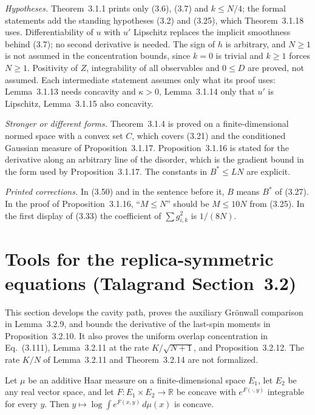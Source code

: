 \begin{remark}\label{rem:sg-tal:st-section31-audit}
\emph{Hypotheses.} Theorem~3.1.1 prints only (3.6), (3.7) and $k\le N/4$; the formal statements add the
standing hypotheses (3.2) and (3.25), which Theorem~3.1.18 uses. Differentiability of $u$ with $u'$ Lipschitz
replaces the implicit smoothness behind (3.7); no second derivative is needed. The sign of $h$ is arbitrary, and
$N\ge1$ is not assumed in the concentration bounds, since $k=0$ is trivial and $k\ge1$ forces $N\ge1$. Positivity of $Z$, integrability of all observables and
$0\le D$ are proved, not assumed. Each intermediate statement assumes only what its proof uses: Lemma~3.1.13
needs concavity and $\kappa>0$, Lemma~3.1.14 only that $u'$ is Lipschitz, Lemma~3.1.15 also concavity.

\emph{Stronger or different forms.} Theorem~3.1.4 is proved on a finite-dimensional normed space with a
convex set $C$, which covers (3.21) and the conditioned Gaussian measure of Proposition~3.1.17.
Proposition~3.1.16 is stated for the derivative along an arbitrary line of the disorder, which is the
gradient bound in the form used by Proposition~3.1.17. The constants in $B^*\le LN$ are explicit.

\emph{Printed corrections.} In (3.50) and in the sentence before it, $B$ means $B^*$ of (3.27). In the proof
of Proposition~3.1.16, ``$M\le N$'' should be $M\le10N$ from (3.25). In the first display of (3.33) the
coefficient of $\sum g_{i,k}^2$ is $1/(8N)$.
\end{remark}

\section{Tools for the replica-symmetric equations (Talagrand Section~3.2)}\label{sec:sg-tal:st-rs-tools}

This section develops the cavity path, proves the auxiliary Gr\"onwall comparison in
Lemma~3.2.9, and bounds the derivative of the last-spin moments in Proposition~3.2.10.
It also proves the uniform overlap concentration in Eq.~(3.111), Lemma~3.2.11 at the rate
$K/\sqrt{N+1}$, and Proposition~3.2.12. The rate $K/N$ of Lemma~3.2.11 and Theorem~3.2.14 are not
formalized.

\begin{lemma}\label{lem:sg-tal:st-marginal}
  \leanok
Let $\mu$ be an additive Haar measure on a finite-dimensional space $E_1$, let $E_2$ be any real vector
space, and let $F:E_1\times E_2\to\mathbb R$ be concave with $e^{F(\cdot,y)}$ integrable for every $y$. Then
$y\mapsto\log\int e^{F(x,y)}\,d\mu(x)$ is concave.
\end{lemma}

